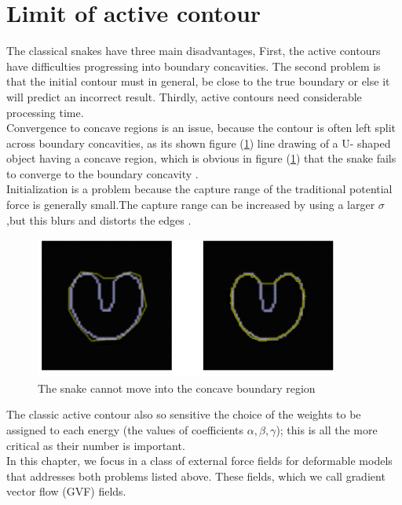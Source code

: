 \section{Limit of active contour}\label{sec:Limit-of-active-contour}

The classical snakes have three main disadvantages, First, the active
contours have difficulties progressing into boundary concavities. The
second problem is that the initial contour must in general, be close to
the true boundary or else it will predict an incorrect result. Thirdly,
active contours need considerable processing time.\\
Convergence to concave regions is an issue, because the contour is often left
split across boundary concavities, as its shown figure (\ref{fig:figure4}) line drawing of a U-
shaped object having a concave region, which is obvious in figure (\ref{fig:figure4}) that the
snake fails to converge to the boundary concavity \cite{2.8}.\\
Initialization is a problem because the capture range of the traditional potential
force is generally small.The capture range can be increased by using a larger
$\sigma$,but this blurs and distorts the edges \cite{2.8}.
\begin{figure}[ht]
        \centering
        \includegraphics[width=10cm]{chapiter2/figures/Figure 5 the snake cannot move into the concave boundary region.png}
        \caption{The snake cannot move into the concave boundary region}
        \label{fig:figure4}
\end{figure}

\hspace{-0.6cm}The classic active contour also so sensitive the choice of the weights to be
assigned to each energy (the values of coefficients $\alpha, \beta, \gamma$); this is all the more
critical as their number is important.\\
In this chapter, we focus in a class of external force fields for deformable
models that addresses both problems listed above. These fields, which we call
gradient vector flow (GVF) fields.


